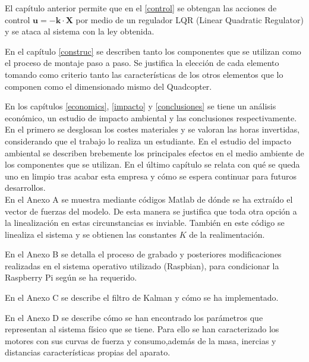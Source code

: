 \documentclass[twoside,11pt]{book}
\begin{document}
El capítulo anterior permite que en el \ref{control} se obtengan las acciones de control $\pmb{u}=-\pmb{k} \cdot \pmb{X}$ por medio de un regulador LQR (Linear Quadratic Regulator) y se ataca al sistema con la ley obtenida.


En el capítulo \ref{construc} se describen tanto los componentes que se utilizan como el proceso de montaje paso a paso. Se justifica la elección de cada elemento tomando como criterio tanto las características de los otros elementos que lo componen como el dimensionado mismo del Quadcopter. 

En los capítulos \ref{economics}, \ref{impacto} y \ref{conclusiones} se tiene un análisis económico, un  estudio de impacto ambiental y las conclusiones respectivamente. En el primero se desglosan los costes materiales y se valoran las horas invertidas, considerando que el trabajo lo realiza un estudiante. En el estudio del impacto ambiental se describen brebemente los principales efectos en el medio ambiente de los componentes que se utilizan. En el último capítulo se relata con qué se queda uno en limpio tras acabar esta empresa y cómo se espera continuar para futuros desarrollos.\\

En el Anexo A se muestra mediante códigos Matlab de dónde se ha extraído el vector de fuerzas del modelo. De esta manera se justifica que toda otra opción a la linealización en estas circunstancias es inviable. También en este código se linealiza el sistema y se obtienen las constantes $K$ de la realimentación.

En el Anexo B se detalla el proceso de grabado y posteriores modificaciones realizadas en el sistema operativo utilizado (Raspbian), para condicionar la Raspberry Pi según se ha requerido.
 
En el Anexo C se describe el filtro de Kalman y cómo se ha implementado. 

En el Anexo D se describe cómo se han encontrado los parámetros que representan al sistema físico que se tiene. Para ello se han caracterizado los motores con sus curvas de fuerza y consumo,además de la masa, inercias y distancias características propias del aparato.


\newpage
\end{document}
